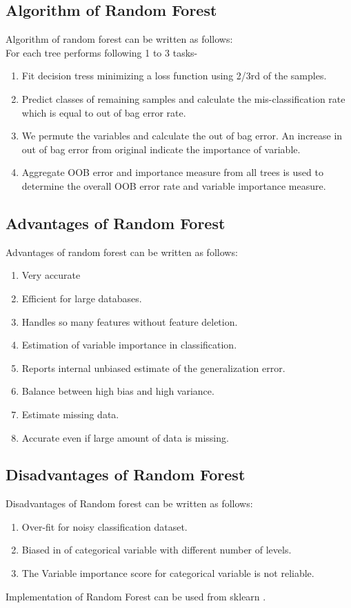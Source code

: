 \documentclass[11pt]{report}
\begin{document}
\subsection{Algorithm of Random Forest}
Algorithm of random forest can be written as follows:\\
For each tree performs following 1 to 3 tasks-
\begin{enumerate}
\item Fit decision tress minimizing a loss function using 2/3rd of the samples.
\item Predict classes of remaining samples and calculate the mis-classification rate which is equal to out of bag error rate.
\item We permute the variables and calculate the out of bag error. An increase in out of bag error from original indicate the importance of variable.
\item Aggregate OOB error and importance measure from all trees is used to determine the overall OOB error rate and variable importance measure.
\end{enumerate}

\subsection{Advantages of Random Forest}
Advantages of random forest can be written as follows:
\begin{enumerate}
\item Very accurate
\item Efficient for large databases.
\item Handles so many features without feature deletion.
\item Estimation of variable importance in classification. 
\item Reports internal unbiased estimate of the generalization error.
\item Balance between high bias and high variance.
\item Estimate missing data.
\item Accurate even if large amount of data is missing.
\end{enumerate}


\subsection{Disadvantages of Random Forest}
Disadvantages of Random forest can be written as follows:
\begin{enumerate}
\item Over-fit for noisy classification dataset.
\item Biased in  of categorical variable with different number of levels.
\item The Variable importance score for categorical variable is not reliable.

\end{enumerate}
Implementation of Random Forest can be used from sklearn \cite{sklearn}.
\end{document}
